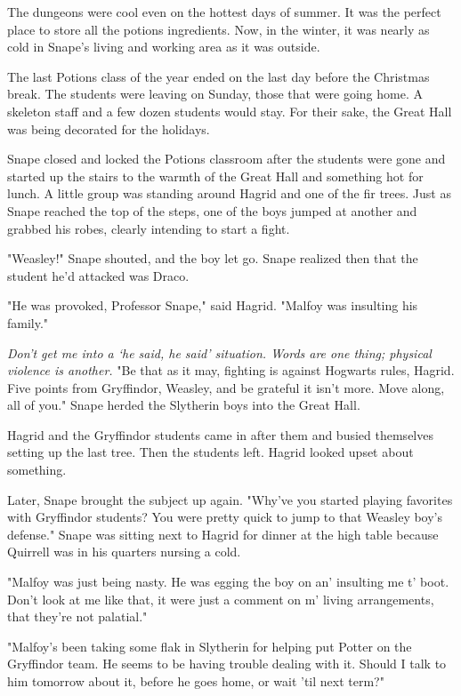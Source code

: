 \documentclass[a4paper,11pt]{article}
\begin{document}
The dungeons were cool even on the hottest days of summer. It was the perfect place to store all the potions ingredients. Now, in the winter, it was nearly as cold in Snape's living and working area as it was outside.

The last Potions class of the year ended on the last day before the Christmas break. The students were leaving on Sunday, those that were going home. A skeleton staff and a few dozen students would stay. For their sake, the Great Hall was being decorated for the holidays.

Snape closed and locked the Potions classroom after the students were gone and started up the stairs to the warmth of the Great Hall and something hot for lunch. A little group was standing around Hagrid and one of the fir trees. Just as Snape reached the top of the steps, one of the boys jumped at another and grabbed his robes, clearly intending to start a fight.

"Weasley!" Snape shouted, and the boy let go. Snape realized then that the student he'd attacked was Draco.

"He was provoked, Professor Snape," said Hagrid. "Malfoy was insulting his family."

\emph{Don't get me into a `he said, he said' situation. Words are one thing; physical violence is another.} "Be that as it may, fighting is against Hogwarts rules, Hagrid. Five points from Gryffindor, Weasley, and be grateful it isn't more. Move along, all of you." Snape herded the Slytherin boys into the Great Hall.

Hagrid and the Gryffindor students came in after them and busied themselves setting up the last tree. Then the students left. Hagrid looked upset about something.

Later, Snape brought the subject up again. "Why've you started playing favorites with Gryffindor students? You were pretty quick to jump to that Weasley boy's defense." Snape was sitting next to Hagrid for dinner at the high table because Quirrell was in his quarters nursing a cold.

"Malfoy was just being nasty. He was egging the boy on an' insulting me t' boot. Don't look at me like that, it were just a comment on m' living arrangements, that they're not palatial."

"Malfoy's been taking some flak in Slytherin for helping put Potter on the Gryffindor team. He seems to be having trouble dealing with it. Should I talk to him tomorrow about it, before he goes home, or wait 'til next term?"
\end{document}
